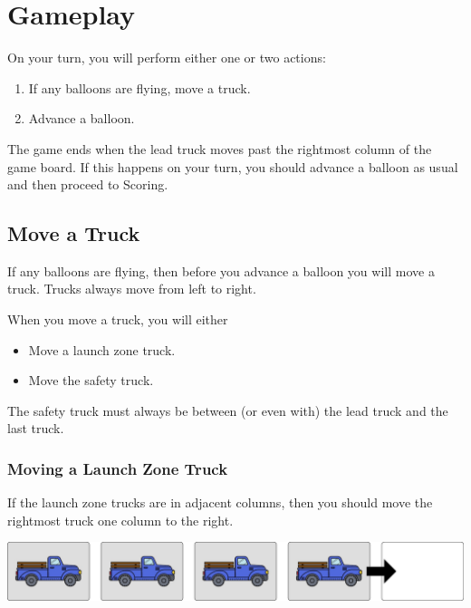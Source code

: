 \documentclass[a6paper, 11pt, parskip=half, DIV=15]{scrartcl}
\begin{document}
\newpage
\enlargethispage{1.75\baselineskip}
\section*{Gameplay}
On your turn, you will perform either one or two actions:
\begin{enumerate}[nosep]
  \item If any balloons are flying, move a truck.
  \item Advance a balloon.
\end{enumerate}

The game ends when the lead truck moves past the rightmost column of the game board. If this happens on your turn, you should advance a balloon as usual and then proceed to {\setmainfont{Fredoka-Bold} \textcolor{SunriseBlue}{Scoring}}.

\subsection*{Move a Truck}
If any balloons are flying, then before you advance a balloon you will move a truck. Trucks always move from left to right.

When you move a truck, you will either
\begin{itemize}[nosep]
  \item Move a launch zone truck.
  \item Move the safety truck.
\end{itemize}

The safety truck must always be between (or even with) the lead truck and the last truck.

\subsubsection*{Moving a Launch Zone Truck}
If the launch zone trucks are in adjacent columns, then you should move the rightmost truck one column to the right.

\begin{center}
\includegraphics[scale=0.1]{wind_diagram_1.jpg}
\end{center}
\end{document}
